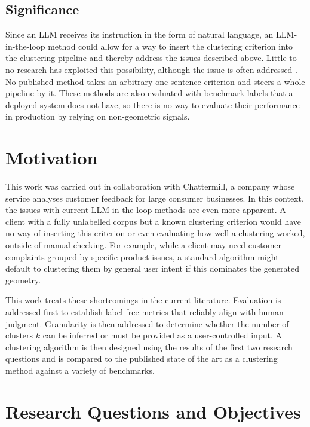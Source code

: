 \documentclass[11pt,a4paper,oneside]{report}
\begin{document}
\subsection{Significance}

Since an LLM receives its instruction in the form of natural language, an LLM-in-the-loop method could allow for a way to insert the clustering criterion into the clustering pipeline and thereby address the issues described above. Little to no research has exploited this possibility, although the issue is often addressed \citep{vonluxburg2012science,su2023instructor,zhang2023clusterllm}. No published method takes an arbitrary one-sentence criterion and steers a whole pipeline by it. These methods are also evaluated with benchmark labels that a deployed system does not have, so there is no way to evaluate their performance in production by relying on non-geometric signals.

\section{Motivation}

This work was carried out in collaboration with Chattermill, a company whose service analyses customer feedback for large consumer businesses. In this context, the issues with current LLM-in-the-loop methods are even more apparent. A client with a fully unlabelled corpus but a known clustering criterion would have no way of inserting this criterion or even evaluating how well a clustering worked, outside of manual checking. For example, while a client may need customer complaints grouped by specific product issues, a standard algorithm might default to clustering them by general user intent if this dominates the generated geometry.

This work treats these shortcomings in the current literature. Evaluation is addressed first to establish label-free metrics that reliably align with human judgment. Granularity is then addressed to determine whether the number of clusters $k$ can be inferred or must be provided as a user-controlled input. A clustering algorithm is then designed using the results of the first two research questions and is compared to the published state of the art as a clustering method against a variety of benchmarks.

\section{Research Questions and Objectives}
\end{document}
